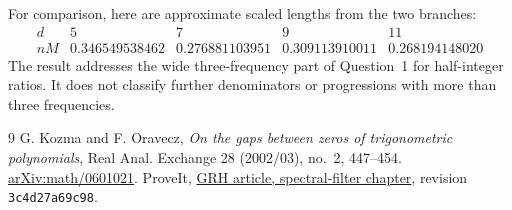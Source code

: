 \documentclass[11pt]{article}
\begin{document}
For comparison, here are approximate scaled lengths from the two
branches:
\[
\begin{array}{c|rrrr}
d & 5 & 7 & 9 & 11\\ \hline
n M & 0.346549538462 & 0.276881103951 &
      0.309113910011 & 0.268194148020
\end{array}
\]
The result addresses the wide three-frequency part of Question~1
for half-integer ratios. It does not classify further denominators
or progressions with more than three frequencies.

\begin{thebibliography}{9}
 G. Kozma and F. Oravecz,
\emph{On the gaps between zeros of trigonometric polynomials},
Real Anal. Exchange 28 (2002/03), no.~2, 447--454.
\href{https://arxiv.org/abs/math/0601021}{arXiv:math/0601021}.
 ProveIt,
\href{https://github.com/VladimirReshetnikov/ProveIt/blob/3c4d27a69c98d09319a51e41a19fca05bb80a3e2/Analysis/GeneralizedRiemannHypothesis/Article/sections/fil.tex}{GRH article, spectral-filter chapter},
revision \texttt{3c4d27a69c98}.
\end{thebibliography}
\end{document}
